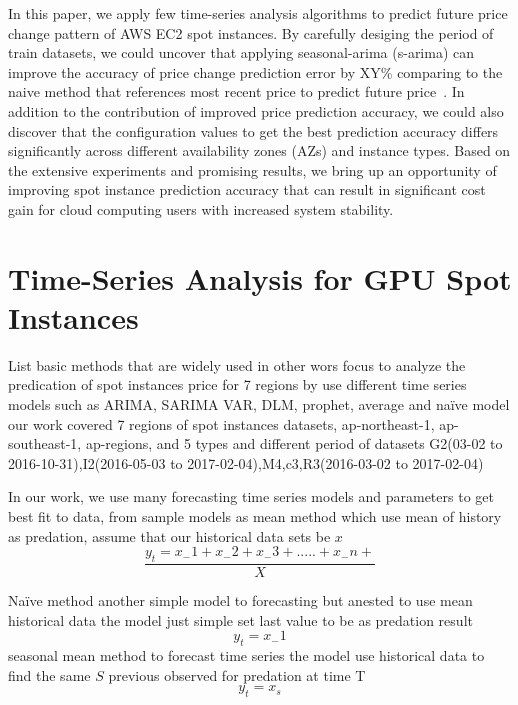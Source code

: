 \documentclass[graybox]{svmult}
\begin{document}
In this paper, we apply few time-series analysis algorithms to predict future price change pattern of AWS EC2 spot instances. By carefully desiging the period of train datasets, we could uncover that applying seasonal-arima (s-arima) can improve the accuracy of price change prediction error by XY\% comparing to the naive method that references most recent price to predict future price~\cite{deep-spot-cloud}. In addition to the contribution of improved price prediction accuracy, we could also discover that the configuration values to get the best prediction accuracy differs significantly across different availability zones (AZs) and instance types. Based on the extensive experiments and promising results, we bring up an opportunity of improving spot instance prediction accuracy that can result in significant cost gain for cloud computing users with increased system stability.


\section{Time-Series Analysis for GPU Spot Instances}
List basic methods that are widely used in other wors
focus to analyze the predication of spot instances price for 7 regions by use different time series models such as ARIMA, SARIMA VAR, DLM, prophet, average and naïve model
our work covered  7 regions of spot instances datasets, ap-northeast-1, ap-southeast-1, ap-regions, and 5 types and different period of datasets G2(03-02 to 2016-10-31),I2(2016-05-03 to 2017-02-04),M4,c3,R3(2016-03-02 to 2017-02-04)



In our work, we use many forecasting time series models and parameters to get best fit to data, from sample models as mean method which use mean of history as predation, assume that our historical data sets be \(x\)
\begin{equation}
 \frac{y_t = x_-1 +x_-2+ x_-3+.....+x_-n+}{X}
\label{mean}
\end{equation} 

Naïve method another simple model to forecasting but anested to use mean historical data the model just simple set last value to be as predation result 
\begin{equation}
 y_t = x_-1 
\label{naive}
\end{equation}
seasonal mean method to forecast time series the model use historical data to find the same \(S\) previous observed for predation at time T 
\begin{equation}
 y_t = x_s 
\label{smean}
\end{equation}
\end{document}
